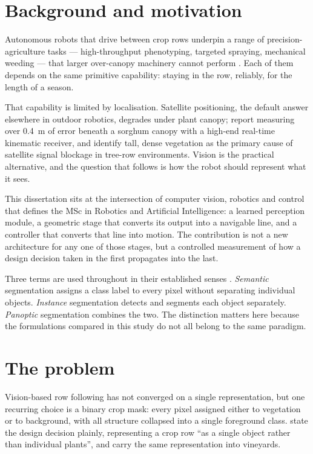 \section{Background and motivation}
\label{sec:intro-background}

Autonomous robots that drive between crop rows underpin a range of
precision-agriculture tasks --- high-throughput phenotyping, targeted spraying,
mechanical weeding --- that larger over-canopy machinery cannot perform
\citep{sivakumar2021}. Each of them depends on the same primitive capability:
staying in the row, reliably, for the length of a season.

That capability is limited by localisation. Satellite positioning, the default
answer elsewhere in outdoor robotics, degrades under plant canopy;
\citet{higuti2019} report measuring over \SI{0.4}{\metre} of error beneath a
sorghum canopy with a high-end real-time kinematic receiver, and
\citet{navone2025} identify tall, dense vegetation as the primary cause of
satellite signal blockage in tree-row environments. Vision is the practical
alternative, and the question that follows is how the robot should represent
what it sees.

This dissertation sits at the intersection of computer vision, robotics and
control that defines the MSc in Robotics and Artificial Intelligence: a learned
perception module, a geometric stage that converts its output into a
navigable line, and a controller that converts that line into motion. The
contribution is not a new architecture for any one of those stages, but a
controlled measurement of how a design decision taken in the first propagates
into the last.

Three terms are used throughout in their established senses
\citep{kirillov2019}. \emph{Semantic} segmentation assigns a class label to
every pixel without separating individual objects. \emph{Instance}
segmentation detects and segments each object separately. \emph{Panoptic}
segmentation combines the two. The distinction matters here because the
formulations compared in this study do not all belong to the same paradigm.

\section{The problem}
\label{sec:intro-problem}

Vision-based row following has not converged on a single representation, but
one recurring choice is a binary crop mask: every pixel assigned either to
vegetation or to background, with all structure collapsed into a single
foreground class. \citet{desilva2024} state the design decision plainly,
representing a crop row ``as a single object rather than individual plants'',
and \citet{aghi2021} carry the same representation into vineyards.

